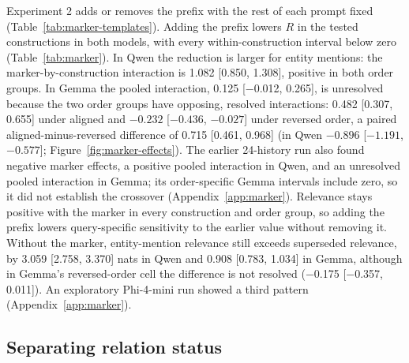 Experiment 2 adds or removes the prefix  with the rest of each prompt fixed (Table~\ref{tab:marker-templates}). Adding the prefix  lowers $R$ in the tested constructions in both models, with every within-construction interval below zero (Table~\ref{tab:marker}). In Qwen the reduction is larger for entity mentions: the marker-by-construction interaction is 1.082 [0.850, 1.308], positive in both order groups. In Gemma the pooled interaction, 0.125 [−0.012, 0.265], is unresolved because the two order groups have opposing, resolved interactions: 0.482 [0.307, 0.655] under aligned and $-0.232$ [$-0.436$, $-0.027$] under reversed order, a paired aligned-minus-reversed difference of 0.715 [0.461, 0.968] (in Qwen $-0.896$ [$-1.191$, $-0.577$]; Figure~\ref{fig:marker-effects}). The earlier 24-history run also found negative marker effects, a positive pooled interaction in Qwen, and an unresolved pooled interaction in Gemma; its order-specific Gemma intervals include zero, so it did not establish the crossover (Appendix~\ref{app:marker}). Relevance stays positive with the marker in every construction and order group, so adding the prefix lowers query-specific sensitivity to the earlier value without removing it. Without the marker, entity-mention relevance still exceeds superseded relevance, by 3.059 [2.758, 3.370] nats in Qwen and 0.908 [0.783, 1.034] in Gemma, although in Gemma's reversed-order cell the difference is not resolved (−0.175 [−0.357, 0.011]). An exploratory Phi-4-mini run showed a third pattern (Appendix~\ref{app:marker}).

\subsection{Separating relation status}
\label{sec:relation-split}

